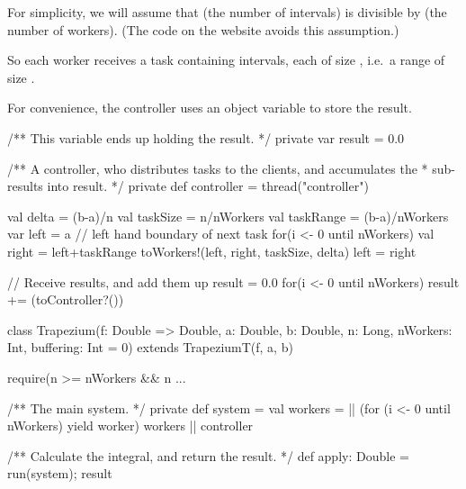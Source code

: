 \begin{slide}

For simplicity, we will assume that  (the number of intervals) is
divisible by  (the number of workers).  (The code on the
website avoids this assumption.) 

So each worker receives a task containing 
intervals, each of size , i.e.~a range of size
.


For convenience, the controller uses an object variable to store the result. 
\begin{scala}
  /** This variable ends up holding the result. */
  private var result = 0.0
\end{scala}
\end{slide}


\begin{slide}

\begin{scala}
  /** A controller, who distributes tasks to the clients, and accumulates the
    * sub-results into result. */
  private def controller = thread("controller"){
    val delta = (b-a)/n
    val taskSize = n/nWorkers
    val taskRange = (b-a)/nWorkers
    var left = a // left hand boundary of next task
    for(i <- 0 until nWorkers){
      val right = left+taskRange
      toWorkers!(left, right, taskSize, delta)
      left = right
    }

    // Receive results, and add them up
    result = 0.0
    for(i <- 0 until nWorkers) result += (toController?())
  }    
\end{scala}
\end{slide}


\begin{slide}

\begin{scala}  
class Trapezium(f: Double => Double, a: Double, b: Double, 
  n: Long, nWorkers: Int, buffering: Int = 0)
    extends TrapeziumT(f, a, b){
  require(n >= nWorkers && n%
  ...
  
  /** The main system. */
  private def system = {
    val workers = || (for (i <- 0 until nWorkers) yield worker)
    workers || controller
  }

  /** Calculate the integral, and return the result. */
  def apply: Double = { run(system); result } 
}
\end{scala}
\end{slide}

